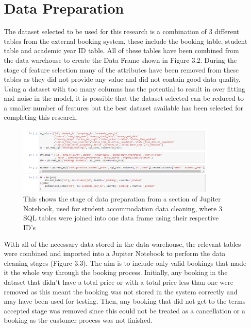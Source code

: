 \section{Data Preparation}

The dataset selected to be used for this research is a combination of 3 different tables from the external booking system, these include the booking table, student table and academic year ID table. All of these tables have been combined from the data warehouse to create the Data Frame shown in Figure 3.2. During the stage of feature selection many of the attributes have been removed from these tables as they did not provide any value and did not contain good data quality. Using a dataset with too many columns has the potential to result in over fitting and noise in the model, it is possible that the dataset selected can be reduced to a smaller number of features but the best dataset available has been selected for completing this research. 

\begin{figure}[H]
 \centering
 \includegraphics[width=10cm]{figures/joining_tables.png}
 \caption{This shows the stage of data preparation from a section of Jupiter Notebook, used for student accommodation data cleaning, where  3 SQL tables were joined into one data frame using their respective ID's}
\end{figure}

With all of the necessary data stored in the data warehouse, the relevant tables were combined and imported into a Jupiter Notebook to perform the data cleaning stages (Figure 3.3). The aim is to include only valid bookings that made it the whole way through the booking process. Initially, any booking in the dataset that didn't have a total price or with a total price less than one were removed as this meant the booking was not stored in the system correctly and may have been used for testing. Then, any booking that did not get to the terms accepted stage was removed since this could not be treated as a cancellation or a booking as the customer process was not finished.

\vspace{5mm}

